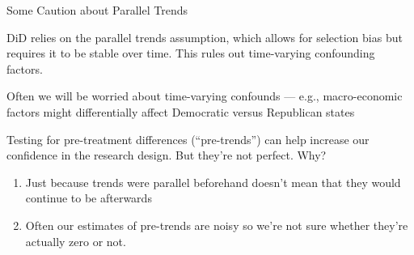 \documentclass[11pt,english,handout]{beamer}
\newenvironment{wideitemize}{\itemize\addtolength{\itemsep}{10pt}}{\enditemize}
\begin{document}
\begin{frame}{Some Caution about Parallel Trends}
	
	\begin{wideitemize}
		\item
		DiD relies on the parallel trends assumption, which allows for selection bias but requires it to be stable over time. \pause This rules out time-varying confounding factors.
		
		\pause
		\item
		Often we will be worried about time-varying confounds --- e.g., macro-economic factors might differentially affect Democratic versus Republican states		 
		
		\pause
		\item
		Testing for pre-treatment differences (``pre-trends'') can help increase our confidence in the research design. \pause But they're not perfect. Why? 
		
		\begin{enumerate}
			\item 
			Just because trends were parallel beforehand doesn't mean that they would continue to be afterwards
			
			\pause
			\item
			Often our estimates of pre-trends are noisy so we're not sure whether they're actually zero or not.
		\end{enumerate}
	\end{wideitemize}

\end{frame}
\end{document}
